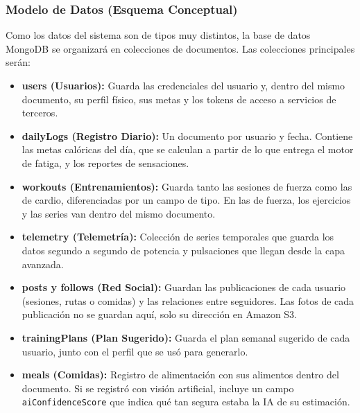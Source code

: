 \begin{center}
\label{fig:interaccion_modulos}
\end{center}
\subsubsection{Modelo de Datos (Esquema Conceptual)}
Como los datos del sistema son de tipos muy distintos, la base de datos MongoDB se organizará en colecciones de documentos. Las colecciones principales serán:
\begin{itemize}
    \item \textbf{users (Usuarios):} Guarda las credenciales del usuario y, dentro del mismo documento, su perfil físico, sus metas y los tokens de acceso a servicios de terceros.
    \item \textbf{dailyLogs (Registro Diario):} Un documento por usuario y fecha. Contiene las metas calóricas del día, que se calculan a partir de lo que entrega el motor de fatiga, y los reportes de sensaciones.
    \item \textbf{workouts (Entrenamientos):} Guarda tanto las sesiones de fuerza como las de cardio, diferenciadas por un campo de tipo. En las de fuerza, los ejercicios y las series van dentro del mismo documento.
    \item \textbf{telemetry (Telemetría):} Colección de series temporales que guarda los datos segundo a segundo de potencia y pulsaciones que llegan desde la capa avanzada.
    \item \textbf{posts y follows (Red Social):} Guardan las publicaciones de cada usuario (sesiones, rutas o comidas) y las relaciones entre seguidores. Las fotos de cada publicación no se guardan aquí, solo su dirección en Amazon S3.
    \item \textbf{trainingPlans (Plan Sugerido):} Guarda el plan semanal sugerido de cada usuario, junto con el perfil que se usó para generarlo.
    \item \textbf{meals (Comidas):} Registro de alimentación con sus alimentos dentro del documento. Si se registró con visión artificial, incluye un campo \texttt{aiConfidenceScore} que indica qué tan segura estaba la IA de su estimación.
\end{itemize}
